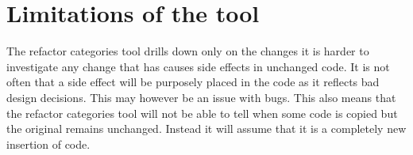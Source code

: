 
% 

\section{Limitations of the tool}
The refactor categories tool drills down only on the changes it is harder to investigate any change that has causes side effects in unchanged code.  It is not often that a side effect will be purposely placed in the code as it reflects bad design decisions.  This may however be an issue with bugs.  This also means that the refactor categories tool will not be able to tell when some code is copied but the original remains unchanged. Instead it will assume that it is a completely new insertion of code.
